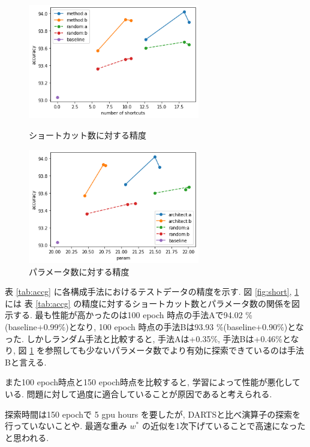 \documentclass[twocolumn]{jarticle}     %
\begin{document}
\begin{figure}[tb]
 \begin{minipage}{0.5\hsize}
 	\begin{center}
 		\includegraphics[clip,width=75mm]{short.png}
 		\caption{ショートカット数に対する精度}
 		\label{fig:short}
 	\end{center}
 \end{minipage}
 \begin{minipage}{0.5\hsize}
 	\begin{center}
    \includegraphics[clip,width=75mm]{param.png}
    \caption{パラメータ数に対する精度}
    \label{fig:param}
 	\end{center}
 \end{minipage}
\end{figure}


表 \ref{tab:accg} に各構成手法におけるテストデータの精度を示す.
図 \ref{fig:short}, \ref{fig:param} には
表 \ref{tab:accg} の精度に対するショートカット数とパラメータ数の関係を図示する.
最も性能が高かったのは100 epoch 時点の手法Aで94.02 \%(baseline+0.99\%)となり,
100 epoch 時点の手法Bは93.93 \%(baseline+0.90\%)となった.
しかしランダム手法と比較すると, 手法Aは+0.35\%, 手法Bは+0.46\%となり,
図 \ref{fig:param} を参照しても少ないパラメータ数でより有効に探索できているのは手法Bと言える.

また100 epoch時点と150 epoch時点を比較すると, 学習によって性能が悪化している.
問題に対して過度に適合していることが原因であると考えられる.

探索時間は150 epochで 5 gpu hours を要したが, DARTSと比べ演算子の探索を行っていないことや.
最適な重み $w^*$ の近似を1次下げていることで高速になったと思われる.
\end{document}
